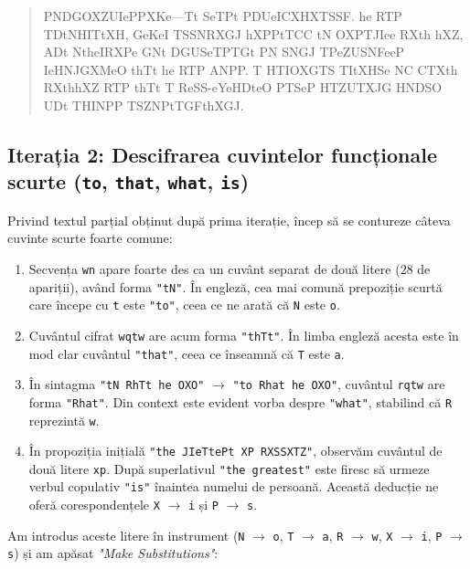 \documentclass{labreport}
\begin{document}
\begin{quote}
PNDGOXZUIePPXKe---Tt SeTPt PDUeICXHXTSSF. he RTP TDtNHITtXH, GeKeI TSSNRXGJ hXPPtTCC tN OXPTJIee RXth hXZ, ADt NtheIRXPe GNt DGUSeTPTGt PN SNGJ TPeZUSNFeeP IeHNJGXMeO thTt he RTP ANPP. T HTIOXGTS TItXHSe NC CTXth RXthhXZ RTP thTt T ReSS-eYeHDteO PTSeP HTZUTXJG HNDSO UDt THINPP TSZNPtTGFthXGJ.
\end{quote}

\subsection{Iterația 2: Descifrarea cuvintelor funcționale scurte (\texttt{to}, \texttt{that}, \texttt{what}, \texttt{is})}

Privind textul parțial obținut după prima iterație, încep să se contureze câteva cuvinte scurte foarte comune:
\begin{enumerate}[leftmargin=*]
    \item Secvența \texttt{wn} apare foarte des ca un cuvânt separat de două litere ($28$ de apariții), având forma \texttt{"tN"}. În engleză, cea mai comună prepoziție scurtă care începe cu \texttt{t} este \texttt{"to"}, ceea ce ne arată că \texttt{N} este \texttt{o}.
    \item Cuvântul cifrat \texttt{wqtw} are acum forma \texttt{"thTt"}. În limba engleză acesta este în mod clar cuvântul \texttt{"that"}, ceea ce înseamnă că \texttt{T} este \texttt{a}.
    \item În sintagma \texttt{"tN RhTt he OXO"} $\to$ \texttt{"to Rhat he OXO"}, cuvântul \texttt{rqtw} are forma \texttt{"Rhat"}. Din context este evident vorba despre \texttt{"what"}, stabilind că \texttt{R} reprezintă \texttt{w}.
    \item În propoziția inițială \texttt{"the JIeTtePt XP RXSSXTZ"}, observăm cuvântul de două litere \texttt{xp}. După superlativul \texttt{"the greatest"} este firesc să urmeze verbul copulativ \texttt{"is"} înaintea numelui de persoană. Această deducție ne oferă corespondențele \texttt{X} $\to$ \texttt{i} și \texttt{P} $\to$ \texttt{s}.
\end{enumerate}

Am introdus aceste litere în instrument (\texttt{N} $\to$ \texttt{o}, \texttt{T} $\to$ \texttt{a}, \texttt{R} $\to$ \texttt{w}, \texttt{X} $\to$ \texttt{i}, \texttt{P} $\to$ \texttt{s}) și am apăsat \textit{"Make Substitutions"}:
\end{document}
